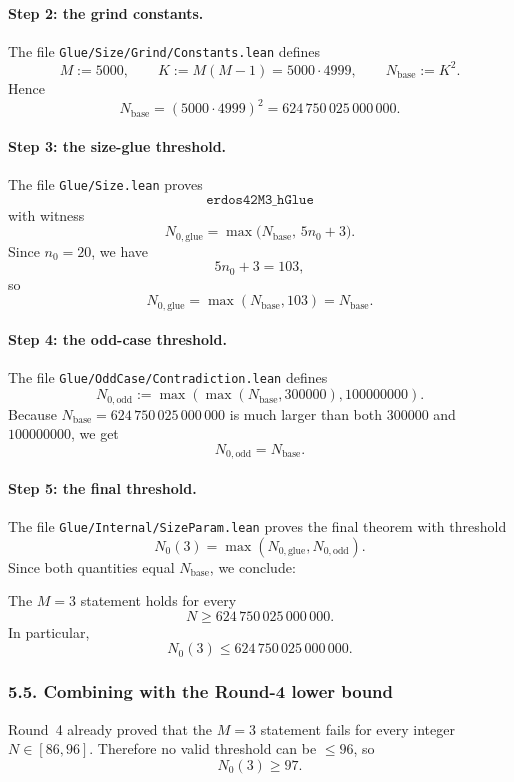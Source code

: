 \paragraph{Step 2: the grind constants.}
The file \texttt{Glue/Size/Grind/Constants.lean} defines
\[
M:=5000,\qquad K:=M(M-1)=5000\cdot 4999,\qquad N_{\mathrm{base}}:=K^2.
\]
Hence
\[
N_{\mathrm{base}}=(5000\cdot 4999)^2=624\,750\,025\,000\,000.
\]

\paragraph{Step 3: the size-glue threshold.}
The file \texttt{Glue/Size.lean} proves
\[
\texttt{erdos42M3\_hGlue}
\]
with witness
\[
N_{0,\mathrm{glue}}=\max\bigl(N_{\mathrm{base}},\, 5n_0+3\bigr).
\]
Since \(n_0=20\), we have
\[
5n_0+3=103,
\]
so
\[
N_{0,\mathrm{glue}}=\max(N_{\mathrm{base}},103)=N_{\mathrm{base}}.
\]

\paragraph{Step 4: the odd-case threshold.}
The file \texttt{Glue/OddCase/Contradiction.lean} defines
\[
N_{0,\mathrm{odd}}:=\max(\max(N_{\mathrm{base}},300000),100000000).
\]
Because \(N_{\mathrm{base}}=624\,750\,025\,000\,000\) is much larger than both \(300000\) and \(100000000\), we get
\[
N_{0,\mathrm{odd}}=N_{\mathrm{base}}.
\]

\paragraph{Step 5: the final threshold.}
The file \texttt{Glue/Internal/SizeParam.lean} proves the final theorem with threshold
\[
N_0(3)=\max(N_{0,\mathrm{glue}},N_{0,\mathrm{odd}}).
\]
Since both quantities equal \(N_{\mathrm{base}}\), we conclude:

\begin{corollary}\label{cor:explicit-upper}
The \(M=3\) statement holds for every
\[
N\ge 624\,750\,025\,000\,000.
\]
In particular,
\[
N_0(3)\le 624\,750\,025\,000\,000.
\]
\end{corollary}

\subsubsection*{5.5. Combining with the Round-4 lower bound}
Round~4 already proved that the \(M=3\) statement fails for every integer \(N\in[86,96]\).  Therefore no valid threshold can be \(\le 96\), so
\[
N_0(3)\ge 97.
\]

